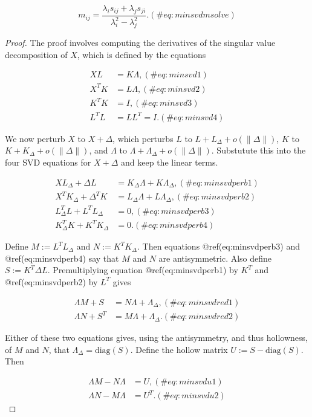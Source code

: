 \documentclass[
  12pt,
  letterpaper,
  DIV=11,
  numbers=noendperiod]{scrreprt}
\theoremstyle{remark}
\begin{document}
\begin{equation}
m_{ij}=\frac{\lambda_is_{ij}+\lambda_js_{ji}}{\lambda_i^2-\lambda_j^2}.
(\#eq:minsvdmsolve)
\end{equation}

\begin{proof}
The proof involves computing the derivatives of the singular value
decomposition of \(X\), which is defined by the equations

\begin{align}
XL&=K\Lambda,(\#eq:minsvd1)\\
X^TK&=L\Lambda,(\#eq:minsvd2)\\
K^TK&=I,(\#eq:minsvd3)\\
L^TL&=LL^T=I.(\#eq:minsvd4)
\end{align}

We now perturb \(X\) to \(X+\Delta\), which perturbs \(L\) to
\(L+L_\Delta+o(\|\Delta\|)\), \(K\) to \(K+K_\Delta+o(\|\Delta\|)\), and
\(\Lambda\) to \(\Lambda+\Lambda_\Delta+o(\|\Delta\|)\). Substutute this
into the four SVD equations for \(X+\Delta\) and keep the linear terms.

\begin{align}
XL_\Delta+\Delta L&=K_\Delta\Lambda+K\Lambda_\Delta,(\#eq:minsvdperb1)\\
X^TK_\Delta+\Delta^TK&=L_\Delta\Lambda+L\Lambda_\Delta,(\#eq:minsvdperb2)\\
L_\Delta^TL+L^TL_\Delta&=0,(\#eq:minsvdperb3)\\
K_\Delta^TK+K^TK_\Delta&=0.(\#eq:minsvdperb4)
\end{align}

Define \(M:=L^TL_\Delta\) and \(N:=K^TK_\Delta\). Then equations
@ref(eq:minsvdperb3) and @ref(eq:minsvdperb4) say that \(M\) and \(N\)
are antisymmetric. Also define \(S:=K^T\Delta L\). Premultiplying
equation @ref(eq:minsvdperb1) by \(K^T\) and @ref(eq:minsvdperb2) by
\(L^T\) gives

\begin{align}
\Lambda M+S&=N\Lambda+\Lambda_\Delta,(\#eq:minsvdred1)\\
\Lambda N+S^T&=M\Lambda+\Lambda_\Delta.(\#eq:minsvdred2)
\end{align}

Either of these two equations gives, using the antisymmetry, and thus
hollowness, of \(M\) and \(N\), that \(\Lambda_\Delta=\text{diag}(S)\).
Define the hollow matrix \(U:=S-\text{diag}(S)\). Then

\begin{align}
\Lambda M-N\Lambda&=U,(\#eq:minsvdu1)\\
\Lambda N-M\Lambda&=U^T.(\#eq:minsvdu2)
\end{align}


\end{proof}
\end{document}
